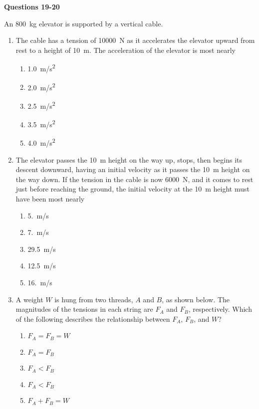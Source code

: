 \documentclass{../../oss-apphys}
\begin{document}
\begin{multicols}{2}
  \textbf{Questions 19-20}

  An \SI{800}{\kilo\gram} elevator is supported by a vertical cable.
  \begin{center}
  \end{center}
  \begin{enumerate}[resume,leftmargin=18pt]
  \item The cable has a tension of \SI{10000}{\newton} as it accelerates the
    elevator upward from rest to a height of \SI{10}{\metre}. The acceleration
    of the elevator is most nearly
    \begin{enumerate}[noitemsep,topsep=0pt,leftmargin=18pt,label=(\Alph*)]
    \item\SI{1.0}{m/s^2}
    \item\SI{2.0}{m/s^2}
    \item\SI{2.5}{m/s^2}
    \item\SI{3.5}{m/s^2}
    \item\SI{4.0}{m/s^2}
    \end{enumerate}
    
  \item The elevator passes the \SI{10}{\metre} height on the way up, stops,
    then begins its descent downward, having an initial velocity as it passes
    the \SI{10}{\metre} height on the way down. If the tension in the cable is
    now \SI{6000}{\newton}, and it comes to rest just before reaching the
    ground, the initial velocity at the \SI{10}{\metre} height must have been
    most nearly
    \begin{enumerate}[noitemsep,topsep=0pt,leftmargin=18pt,label=(\Alph*)]
    \item\SI{5.}{m/s}
    \item\SI{7.}{m/s}
    \item\SI{29.5}{m/s}
    \item\SI{12.5}{m/s}
    \item\SI{16.}{m/s}
    \end{enumerate}

  \item A weight $W$ is hung from two threads, $A$ and $B$, as shown below. The
    magnitudes of the tensions in each string are $F_A$ and $F_B$, respectively.
    Which of the following describes the relationship between $F_A$, $F_B$, and
    $W$?
    \begin{center}
    \end{center}
    \begin{enumerate}[noitemsep,topsep=0pt,leftmargin=18pt,label=(\Alph*)]
    \item $F_A=F_B=W$
    \item $F_A=F_B$
    \item $F_A<F_B$
    \item $F_A<F_B$
    \item $F_A+F_B=W$
    \end{enumerate}
  \end{enumerate}
  

\end{multicols}
\end{document}
